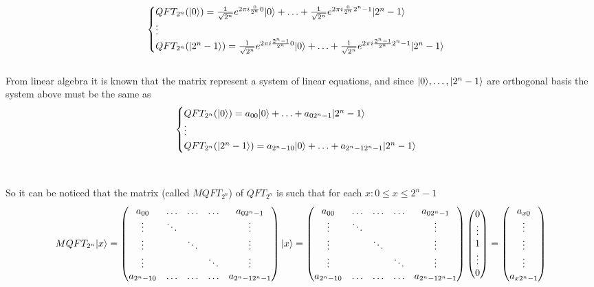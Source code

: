 \documentclass{article}
\DeclarePairedDelimiter\ket{\lvert}{\rangle}
\begin{document}
\[\begin{cases} 
    QFT_{2^n}(\ket{0}) = \frac{1}{\sqrt{2^n}}e^{2\pi i \frac{0}{2^n}0}\ket{0}  + \ldots  + \frac{1}{\sqrt{2^n}}e^{2\pi i \frac{0}{2^n}2^n-1}\ket{2^n-1}  \\
    \vdots  \\
    QFT_{2^n}(\ket{2^n-1})  = \frac{1}{\sqrt{2^n}}e^{2\pi i \frac{2^n-1}{2^n}0}\ket{0} +  \ldots  +  \frac{1}{\sqrt{2^n}}e^{2\pi i \frac{2^n-1}{2^n}2^n-1}\ket{2^n-1} 
\end{cases}\]
\\
From linear algebra it is known that the matrix represent a system of linear equations, and since $\ket{0}, \ldots, \ket{2^n-1}$ are orthogonal basis the system above must be the same as 
\[\begin{cases} 
    QFT_{2^n}(\ket{0}) = a_{00}\ket{0}  + \ldots  + a_{02^n-1}\ket{2^n-1}  \\
    \vdots  \\
    QFT_{2^n}(\ket{2^n-1})  = a_{2^n-10}\ket{0} +  \ldots  +  a_{2^n-12^n-1}\ket{2^n-1} 
\end{cases}\]
\\
\\
So it can be noticed that the matrix (called $MQFT_{2^n}$) of $QFT_{2^n}$ is such that for each $x : 0 \leq x \leq 2^n-1 $ 
\[ MQFT_{2^n}\ket{x} = \begin{pmatrix} a_{00} & \ldots & \ldots & \ldots & a_{02^n-1} \\ \vdots & \ddots & & & \vdots \\ \vdots & & \ddots & & \vdots \\ \vdots & & & \ddots & \vdots \\a_{2^n-10} & \ldots & \ldots& \ldots &a_{2^n-12^n-1} \end{pmatrix} \ket{x} = \begin{pmatrix} a_{00} & \ldots & \ldots & \ldots & a_{02^n-1} \\ \vdots & \ddots & & & \vdots \\ \vdots & & \ddots & & \vdots \\ \vdots & & & \ddots & \vdots \\a_{2^n-10} & \ldots & \ldots& \ldots &a_{2^n-12^n-1} \end{pmatrix} \begin{pmatrix} 0 \\ \vdots \\ 1  \\ \vdots \\ 0 \end{pmatrix} =  \begin{pmatrix} a_{x0} \\ \vdots \\ \vdots \\\vdots \\ a_{x2^n-1}\end{pmatrix} \]
\end{document}
